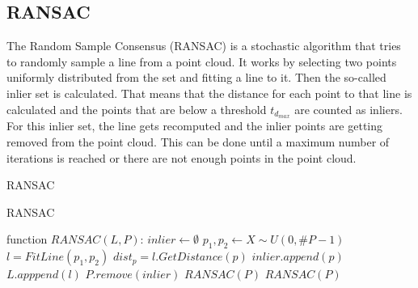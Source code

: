 \documentclass{scp}
\begin{document}
\subsection*{RANSAC} \label{sec:ransac}
The Random Sample Consensus (RANSAC) \cite{Nguyen} is a stochastic algorithm that tries to randomly sample a line from a point cloud. It works by selecting two points uniformly distributed from the set and fitting a line to it. Then the so-called inlier set is calculated. That means that the distance for each point to that line is calculated and the points that are below a threshold $t_{d_{max}}$ are counted as inliers. For this inlier set, the line gets recomputed and the inlier points are getting removed from the point cloud. This can be done until a maximum number of iterations is reached or there are not enough points in the point cloud.


\begin{algorithm}[h]
\caption{RANSAC}\label{ransac}
\begin{algorithmic}[1]
\caption{RANSAC}
\State function $RANSAC(L,P)$:
    \State \Return
\EndIf
\State $inlier \leftarrow \emptyset$
\State $p_1,p_2 \leftarrow X \sim U(0,\#P-1)$
\State $l = FitLine(p_1,p_2)$
    \State $dist_p = l.GetDistance(p)$
        \State $inlier.append(p)$
    \EndIf
\EndFor
{}
    \State $L.apppend(l)$
    \State $P.remove(inlier)$
    \State $RANSAC(P)$
\Else
    \State $RANSAC(P)$
\EndIf
\end{algorithmic}
\end{algorithm}
\end{document}
